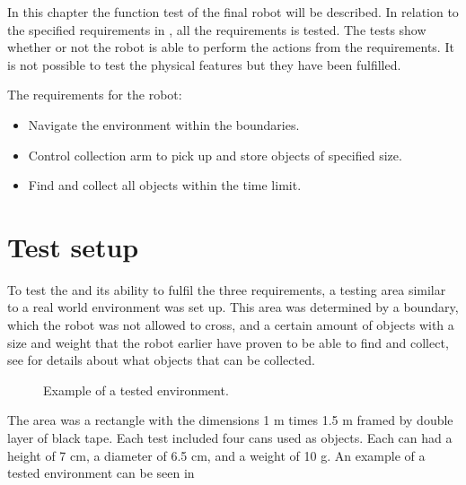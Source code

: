 In this chapter the function test of the final robot will be described. In relation to the specified requirements in , all the requirements is tested. The tests show whether or not the robot is able to perform the actions from the requirements. It is not possible to test the physical features but they have been fulfilled.

The requirements for the robot: 
\begin{itemize}
\item Navigate the environment within the boundaries.
\item Control collection arm to pick up and store objects of specified size.
\item Find and collect all objects within the time limit.
\end{itemize}


\section{Test setup}
To test the \projname{} and its ability to fulfil the three requirements, a testing area similar to a real world environment was set up. This area was determined by a boundary, which the robot was not allowed to cross, and a certain amount of objects with a size and weight that the robot earlier have proven to be able to find and collect, see  for details about what objects that can be collected.

\begin{figure}[H]
     \caption{\label{fig:test-setup} Example of a tested environment.}
\end{figure}

The area was a rectangle with the dimensions 1 m times 1.5 m framed by double layer of black tape. Each test included four cans used as objects. Each can had a height of 7 cm, a diameter of 6.5 cm, and a weight of 10 g. An example of a tested environment can be seen in 


